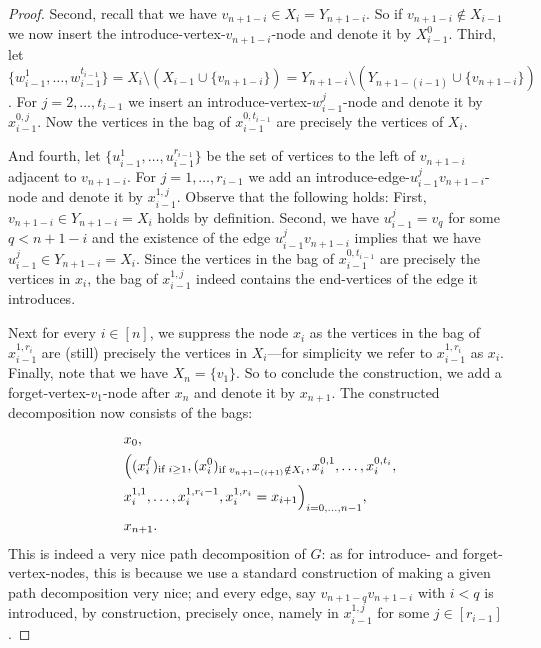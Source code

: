 \documentclass[a4paper,UKenglish,cleveref, autoref, thm-restate]{lipics-v2021}
\begin{document}
\begin{proof}
	Second, recall that we have $v_{n+1-i} \in X_i = Y_{n+1-i}$. 
	So if $v_{n+1-i} \notin X_{i-1}$ we now insert the introduce-vertex-$v_{n+1-i}$-node and denote it by $X_{i-1}^{0}$.
	Third, let $\{w^1_{i-1}, \dots, w^{t_{i-1}}_{i-1}\} = X_i \setminus (X_{i-1} \cup \{v_{n+1-i}\}) = Y_{n+1-i} \setminus (Y_{n+1-(i-1)} \cup \{v_{n+1-i}\})$.
	For $j = 2, \dots, t_{i-1}$ we insert an introduce-vertex-$w_{i-1}^j$-node and denote it by $x_{i-1}^{0,j}$.
	Now the vertices in the bag of $x_{i-1}^{0,t_{i-1}}$ are precisely the vertices of $X_i$. 
	
	And fourth, let $\{u^1_{i-1}, \dots, u^{r_{i-1}}_{i-1}\}$ be the set of vertices to the left of $v_{n+1-i}$ adjacent to $v_{n+1-i}$.
	For $j = 1, \dots, r_{i-1}$ we add an introduce-edge-$u_{i-1}^j v_{n+1-i}$-node and denote it by $x_{i-1}^{1,j}$.
	Observe that the following holds:
	First, $v_{n+1-i} \in Y_{n+1-i} = X_i$ holds by definition.
	Second, we have $u_{i-1}^j = v_q$ for some $q < n+1-i$ and the existence of the edge $u_{i-1}^j v_{n+1-i}$ implies that we have $u_{i-1}^j \in Y_{n+1-i} = X_i$.
	Since the vertices in the bag of $x_{i-1}^{0,t_{i-1}}$ are precisely the vertices in $x_i$, the bag of $x_{i-1}^{1,j}$ indeed contains the end-vertices of the edge it introduces.	
	
	Next for every $i \in [n]$, we suppress the node $x_i$ as the vertices in the bag of $x_{i-1}^{1,r_i}$ are (still) precisely the vertices in $X_i$---for simplicity we refer to $x_{i-1}^{1,r_i}$ as $x_i$.
	Finally, note that we have $X_n = \{v_1\}$.
	So to conclude the construction, we add a forget-vertex-$v_1$-node after $x_n$ and denote it by $x_{n+1}$.
	The constructed decomposition now consists of the bags:
	\begin{align*}
		& x_0, \\ 
		& \Bigl((x_i^f)_{\text{if } i \geq 1}, (x_i^0)_{\text{if } v_{n+1-(i+1)} \notin X_i}, x_i^{0,1}, \dots, x_i^{0,t_i}, \\
		& x_i^{1,1}, \dots, x_i^{1,r_i-1}, x_i^{1,r_i}=x_{i+1}\Bigr)_{i = 0, \dots, n-1}, \\
		& x_{n+1}. 
	\end{align*}
	This is indeed a very nice path decomposition of $G$: as for introduce- and forget-vertex-nodes, this is because we use a standard construction of making a given path decomposition very nice; and every edge, say $v_{n+1-q} v_{n+1-i}$ with $i < q$ is introduced, by construction, precisely once, namely in $x_{i-1}^{1, j}$ for some $j \in [r_{i-1}]$.
	

\end{proof}
\end{document}

